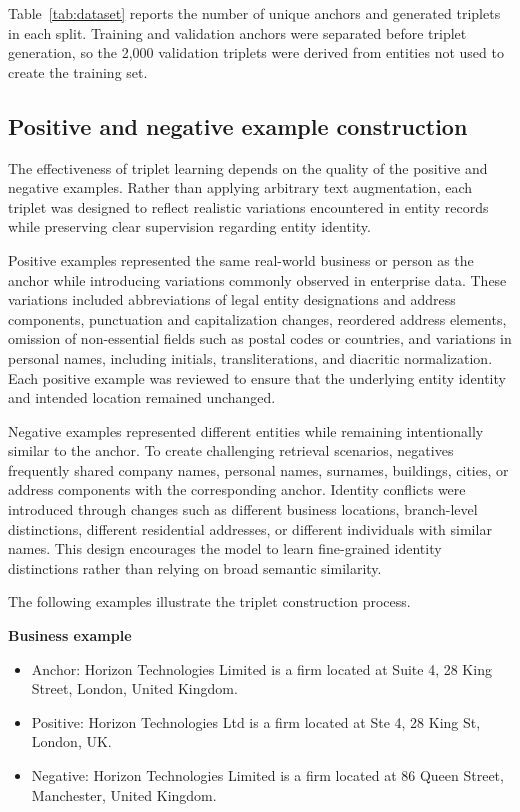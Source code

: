 \documentclass{article}
\begin{document}
Table~\ref{tab:dataset} reports the number of unique anchors and generated triplets in each split. Training and validation anchors were separated before triplet generation, so the 2,000 validation triplets were derived from entities not used to create the training set.

\subsection{Positive and negative example construction}

The effectiveness of triplet learning depends on the quality of the positive and negative examples. Rather than applying arbitrary text augmentation, each triplet was designed to reflect realistic variations encountered in entity records while preserving clear supervision regarding entity identity.

Positive examples represented the same real-world business or person as the anchor while introducing variations commonly observed in enterprise data. These variations included abbreviations of legal entity designations and address components, punctuation and capitalization changes, reordered address elements, omission of non-essential fields such as postal codes or countries, and variations in personal names, including initials, transliterations, and diacritic normalization. Each positive example was reviewed to ensure that the underlying entity identity and intended location remained unchanged.

Negative examples represented different entities while remaining intentionally similar to the anchor. To create challenging retrieval scenarios, negatives frequently shared company names, personal names, surnames, buildings, cities, or address components with the corresponding anchor. Identity conflicts were introduced through changes such as different business locations, branch-level distinctions, different residential addresses, or different individuals with similar names. This design encourages the model to learn fine-grained identity distinctions rather than relying on broad semantic similarity.

The following examples illustrate the triplet construction process.

\textbf{Business example}
\begin{itemize}
  \item Anchor: Horizon Technologies Limited is a firm located at Suite 4, 28 King Street, London, United Kingdom.
  \item Positive: Horizon Technologies Ltd is a firm located at Ste 4, 28 King St, London, UK.
  \item Negative: Horizon Technologies Limited is a firm located at 86 Queen Street, Manchester, United Kingdom.
\end{itemize}
\end{document}
